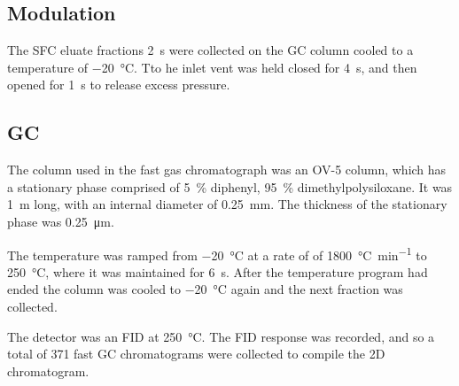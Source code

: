 \subsection{Modulation}

The SFC eluate fractions \SI{2}{\second} were collected on the GC column
cooled to a temperature of \SI{-20}{\celsius}. Tto he inlet vent was held closed
for \SI{4}{\second}, and then opened for \SI{1}{\second} to release excess
pressure.

\subsection{GC}

The column used in the fast gas chromatograph was an OV-5 column, which has a
stationary phase comprised of \SI{5}{\percent} diphenyl, \SI{95}{\percent}
dimethylpolysiloxane. It was \SI{1}{\metre} long, with an internal diameter of
\SI{0.25}{\milli\metre}. The thickness of the stationary phase was
\SI{0.25}{\micro\metre}.

The temperature was ramped from \SI{-20}{\celsius} at a rate of of
\SI{1800}{\celsius\per\minute} to \SI{250}{\celsius}, where it was maintained
for \SI{6}{s}. After the temperature program had ended the column was cooled to
\SI{-20}{\celsius} again and the next fraction was collected.

The detector was an FID at \SI{250}{\celsius}. The FID response was recorded,
and so a total of 371 fast GC chromatograms were collected to compile the 2D
chromatogram.

